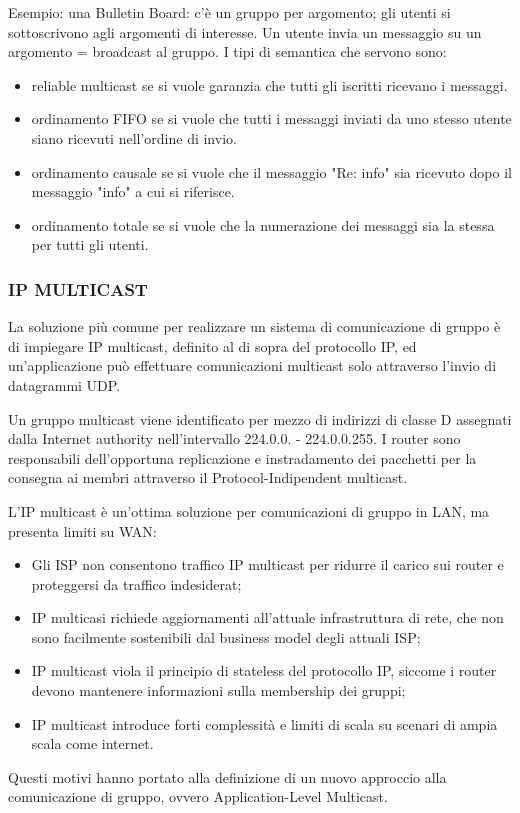 Esempio: una Bulletin Board: c'è un gruppo per argomento; gli utenti si sottoscrivono agli argomenti di interesse. Un utente invia un messaggio su un argomento = broadcast al gruppo. I tipi di semantica che servono sono:
\begin{itemize}
    \item reliable multicast se si vuole garanzia che tutti gli iscritti ricevano i messaggi.
    \item ordinamento FIFO se si vuole che tutti i messaggi inviati da uno stesso utente siano ricevuti nell'ordine di invio.
    \item ordinamento causale se si vuole che il messaggio "Re: info" sia ricevuto dopo il messaggio "info" a cui si riferisce.
    \item ordinamento totale se si vuole che la numerazione dei messaggi sia la stessa per tutti gli utenti.
\end{itemize}

\subsubsection{IP MULTICAST}
La soluzione più comune per realizzare un sistema di comunicazione di gruppo è di impiegare IP multicast, definito al di sopra del protocollo IP, ed un'applicazione può effettuare comunicazioni multicast solo attraverso l'invio di datagrammi UDP.

Un gruppo multicast viene identificato per mezzo di indirizzi di classe D assegnati dalla Internet authority nell'intervallo 224.0.0. - 224.0.0.255. I router sono responsabili dell'opportuna replicazione e instradamento dei pacchetti per la consegna ai membri attraverso il Protocol-Indipendent multicast.

L'IP multicast è un'ottima soluzione per comunicazioni di gruppo in LAN, ma presenta limiti su WAN:
\begin{itemize}
    \item Gli ISP non consentono traffico IP multicast per ridurre il carico sui router e proteggersi da traffico indesiderat;
    \item IP multicasi richiede aggiornamenti all'attuale infrastruttura di rete, che non sono facilmente sostenibili dal business model degli attuali ISP;
    \item IP multicast viola il principio di stateless del protocollo IP, siccome i router devono mantenere informazioni sulla membership dei gruppi;
    \item IP multicast introduce forti complessità e limiti di scala su scenari di ampia scala come internet.
\end{itemize}
Questi motivi hanno portato alla definizione di un nuovo approccio alla comunicazione di gruppo, ovvero Application-Level Multicast.
